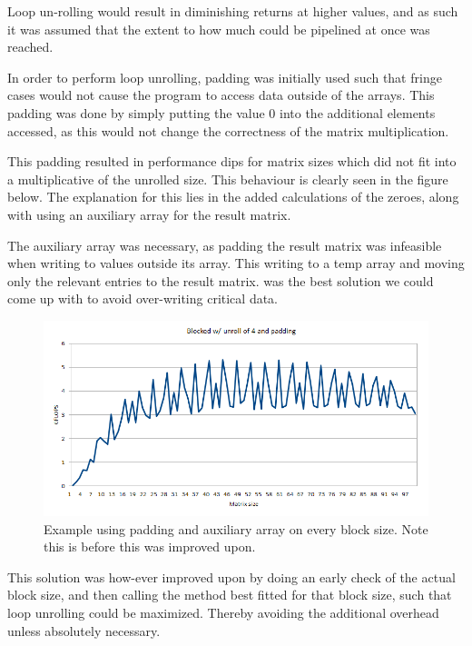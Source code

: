\documentclass[a4paper,11pt,oneside]{book}
\begin{document}

Loop un-rolling would result in diminishing returns at higher values, and as such
it was assumed that the extent to how much could be pipelined at once was reached.


In order to perform loop unrolling, padding was initially used such that fringe
cases would not cause the program to access data outside of the arrays. This
padding was done by simply putting the value 0 into the additional elements
accessed, as this would not change the correctness of the matrix multiplication.

This padding resulted in performance dips for matrix sizes which did not fit
into a multiplicative of the unrolled size. This behaviour is clearly seen in
the figure below. The explanation for this lies in the added calculations of the
zeroes, along with using an auxiliary array for the result matrix.

The auxiliary array was necessary, as padding the result matrix was infeasible
when writing to values outside its array. This writing to a temp array and
moving only the relevant entries to the result matrix. was the best solution 
we could come up with to avoid over-writing critical data.

\begin{figure}
  \centering
  \includegraphics[width=0.9\linewidth]{graph-blocked-padding.png}
  \caption{Example using padding and auxiliary array on every block size. Note 
  this is before this was improved upon.}
  \centering
  \label{fig:sub1}
\end{figure}

This solution was how-ever improved upon by doing an early check of the actual block
size, and then calling the method best fitted for that block size, such that
loop unrolling could be maximized. Thereby avoiding the additional overhead unless
absolutely necessary.
\end{document}
